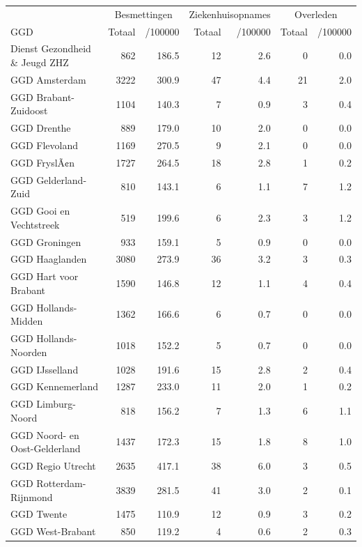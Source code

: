 \documentclass[
  english,
  man,floatsintext]{apa6}
\begin{document}
\begin{table}
\centering\begingroup\fontsize{10}{12}\selectfont

\begin{threeparttable}
\begin{tabular}{lrrrrrr}
\toprule
\multicolumn{1}{c}{ } & \multicolumn{2}{c}{Besmettingen} & \multicolumn{2}{c}{Ziekenhuisopnames} & \multicolumn{2}{c}{Overleden} \\
\cmidrule(l{3pt}r{3pt}){2-3} \cmidrule(l{3pt}r{3pt}){4-5} \cmidrule(l{3pt}r{3pt}){6-7}
GGD & Totaal & /100000 & Totaal & /100000 & Totaal & /100000\\
\midrule
Dienst Gezondheid \& Jeugd ZHZ & 862 & 186.5 & 12 & 2.6 & 0 & 0.0\\
GGD Amsterdam & 3222 & 300.9 & 47 & 4.4 & 21 & 2.0\\
GGD Brabant-Zuidoost & 1104 & 140.3 & 7 & 0.9 & 3 & 0.4\\
GGD Drenthe & 889 & 179.0 & 10 & 2.0 & 0 & 0.0\\
GGD Flevoland & 1169 & 270.5 & 9 & 2.1 & 0 & 0.0\\
GGD FryslÃ¢n & 1727 & 264.5 & 18 & 2.8 & 1 & 0.2\\
GGD Gelderland-Zuid & 810 & 143.1 & 6 & 1.1 & 7 & 1.2\\
GGD Gooi en Vechtstreek & 519 & 199.6 & 6 & 2.3 & 3 & 1.2\\
GGD Groningen & 933 & 159.1 & 5 & 0.9 & 0 & 0.0\\
GGD Haaglanden & 3080 & 273.9 & 36 & 3.2 & 3 & 0.3\\
GGD Hart voor Brabant & 1590 & 146.8 & 12 & 1.1 & 4 & 0.4\\
GGD Hollands-Midden & 1362 & 166.6 & 6 & 0.7 & 0 & 0.0\\
GGD Hollands-Noorden & 1018 & 152.2 & 5 & 0.7 & 0 & 0.0\\
GGD IJsselland & 1028 & 191.6 & 15 & 2.8 & 2 & 0.4\\
GGD Kennemerland & 1287 & 233.0 & 11 & 2.0 & 1 & 0.2\\
GGD Limburg-Noord & 818 & 156.2 & 7 & 1.3 & 6 & 1.1\\
GGD Noord- en Oost-Gelderland & 1437 & 172.3 & 15 & 1.8 & 8 & 1.0\\
GGD Regio Utrecht & 2635 & 417.1 & 38 & 6.0 & 3 & 0.5\\
GGD Rotterdam-Rijnmond & 3839 & 281.5 & 41 & 3.0 & 2 & 0.1\\
GGD Twente & 1475 & 110.9 & 12 & 0.9 & 3 & 0.2\\
GGD West-Brabant & 850 & 119.2 & 4 & 0.6 & 2 & 0.3\\

\end{tabular}
\end{threeparttable}
\end{table}
\end{document}
